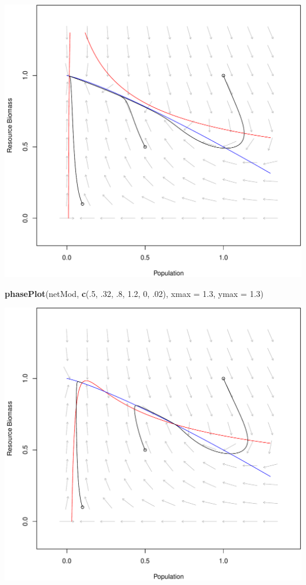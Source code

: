 \documentclass[]{article}
\newenvironment{Shaded}{\begin{snugshade}}{\end{snugshade}}
\newcommand{\KeywordTok}[1]{\textcolor[rgb]{0.13,0.29,0.53}{\textbf{{#1}}}}
\newcommand{\DataTypeTok}[1]{\textcolor[rgb]{0.13,0.29,0.53}{{#1}}}
\newcommand{\DecValTok}[1]{\textcolor[rgb]{0.00,0.00,0.81}{{#1}}}
\newcommand{\FloatTok}[1]{\textcolor[rgb]{0.00,0.00,0.81}{{#1}}}
\newcommand{\NormalTok}[1]{{#1}}
\begin{document}
\includegraphics{consumerresource_files/figure-latex/unnamed-chunk-10-1.pdf}

\begin{Shaded}
\begin{Highlighting}[]
\KeywordTok{phasePlot}\NormalTok{(netMod, }\KeywordTok{c}\NormalTok{(.}\DecValTok{5}\NormalTok{, .}\DecValTok{32}\NormalTok{, .}\DecValTok{8}\NormalTok{, }\FloatTok{1.2}\NormalTok{, }\DecValTok{0}\NormalTok{, .}\DecValTok{02}\NormalTok{), }\DataTypeTok{xmax =} \FloatTok{1.3}\NormalTok{, }\DataTypeTok{ymax =} \FloatTok{1.3}\NormalTok{)}
\end{Highlighting}
\end{Shaded}

\includegraphics{consumerresource_files/figure-latex/unnamed-chunk-11-1.pdf}
\end{document}
